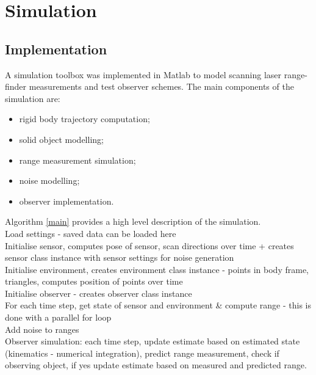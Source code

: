 \chapter{Simulation}
\section{Implementation}
A simulation toolbox was implemented in Matlab to model scanning laser range-finder measurements and test observer schemes. The main components of the simulation are:
\begin{itemize}
\item rigid body trajectory computation;
\item solid object modelling;
\item range measurement simulation;
\item noise modelling;
\item observer implementation.
\end{itemize}

Algorithm \ref{main} provides a high level description of the simulation.\\
Load settings - saved data can be loaded here\\
Initialise sensor, computes pose of sensor, scan directions over time + creates sensor class instance with sensor settings for noise generation\\
Initialise environment, creates environment class instance - points in body frame, triangles, computes position of points over time\\
Initialise observer - creates observer class instance\\
For each time step, get state of sensor and environment \& compute range - this is done with a parallel for loop\\
Add noise to ranges\\
Observer simulation: each time step, update estimate based on estimated state (kinematics - numerical integration), predict range measurement, check if observing object, if yes update estimate  based on measured and predicted range.

